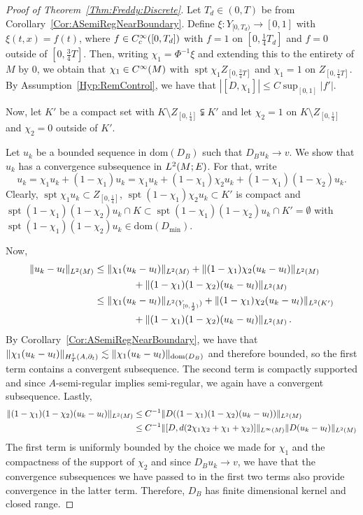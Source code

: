 \documentclass[a4paper,10pt,reqno]{amsart}
\newcommand{\modulus}[1]{|#1|}
\newcommand{\norm}[1]{\| #1 \|}%
\newcommand{\Lp}[2][{}]{{\rm L}^{#2}_{\rm #1}}%
\newcommand{\Ck}[2][{}]{{\rm C}^{#2}_{\rm #1}}%
\newcommand{\Hard}[2][{}]{{\rm H}^{#2}_{\rm #1}}%
\newcommand{\SobH}[2][{}]{\Hard[#1]{\rm #2}}
\newcommand{\dom}{\mathrm{dom}}
\DeclareMathOperator{\spt}{spt}%
\theoremstyle{definition}
\begin{document}
\begin{proof}[Proof of Theorem~\ref{Thm:Freddy:Discrete}]
Let $T_d \in  (0,T)$ be from  Corollary~\ref{Cor:ASemiRegNearBoundary}.
Define $\xi: Y_{[0,T_d)} \to [0,1]$ with $\xi(t,x) = f(t)$, where $f \in \Ck[c]{\infty}([0,T_d])$ with $f = 1$ on $[0,\tfrac 14 T_d ]$ and $f = 0$ outside of $[0,\tfrac 34 T]$.
Then, writing $\chi_1 = \Phi^{-1}\xi$ and extending this to the entirety of $M$ by $0$, we obtain that $\chi_1 \in \Ck{\infty}(M)$ with $\spt \chi_1 Z_{[0,\tfrac34 T]}$ and $\chi_1 = 1$ on $Z_{[0,\tfrac 14 T]}$. 
By Assumption~\ref{Hyp:RemControl}, we have that $\modulus{[D, \chi_1]} \leq C \sup_{[0,1]} |f'| $.

Now, let $K'$ be a compact set with $K \setminus Z_{[0,\tfrac14]} \subsetneqq K'$  and let $\chi_2 = 1$ on $K \setminus Z_{[0,\tfrac14]}$ and $\chi_2 = 0$ outside of $K'$.

Let $u_k$ be a bounded sequence in $\dom(D_B)$ such that $D_B u_k \to v$.
We show that $u_k$ has a convergence subsequence in $\Lp{2}(M;E)$.
For that, write 
$$u_k = \chi_1 u_k + (1 - \chi_1)u_k = \chi_1 u_k + (1 - \chi_1)\chi_2 u_k  + (1 - \chi_1)(1 - \chi_2) u_k.$$
Clearly, $\spt \chi_1 u_k \subset Z_{[0,\tfrac14]}$, $\spt (1 - \chi_1)\chi_2 u_k \subset K'$ is compact and $\spt (1 - \chi_1)(1 - \chi_2) u_k \cap K \subset \spt (1 - \chi_1)(1 - \chi_2) u_k \cap K' = \emptyset$ with $\spt (1 - \chi_1)(1 - \chi_2) u_k \in \dom(D_{\min})$.

Now, 
\begin{align*} 
\norm{u_k - u_l}_{\Lp{2}(M)} 
&\leq 
\norm{\chi_1 (u_k - u_l)}_{\Lp{2}(M)} +   \norm{ (1 - \chi_1)\chi_2 (u_k - u_l) }_{\Lp{2}(M)} \\ 
&\qquad\qquad + \norm{(1 - \chi_1)(1 - \chi_2) (u_k - u_l)}_{\Lp{2}(M)} \\ 
&\leq 
\norm{\chi_1 (u_k - u_l)}_{\Lp{2}(Y_{[0,\frac12)})} + \norm{ (1 - \chi_1)\chi_2 (u_k - u_l) }_{\Lp{2}(K')}   \\
&\qquad\qquad+\norm{(1 - \chi_1)(1 - \chi_2) (u_k - u_l)}_{\Lp{2}(M)} \,  .
\end{align*}
By Corollary~\ref{Cor:ASemiRegNearBoundary}, we have that $ \norm{\chi_1 (u_k - u_l)}_{\SobH[T]{1}(A,\partial_t)} \lesssim \norm{\chi_1 (u_k - u_l)}_{\dom(D_B)}$ and therefore bounded, so the first term contains a convergent subsequence.
The second term is compactly supported and since $A$-semi-regular implies semi-regular, we again have a convergent subsequence.
Lastly,
\begin{align*} 
\norm{(1 - \chi_1)(1 - \chi_2) (u_k - u_l)}_{\Lp{2}(M)} 
& \leq C^{-1} \norm{D((1 - \chi_1)(1 - \chi_2) (u_k - u_l))}_{\Lp{2}(M)} \\ 
&\leq C^{-1} \norm{[D, d(2\chi_1\chi_2 + \chi_1 + \chi_2)]}_{\Lp{\infty}(M)} \norm{D(u_k - u_l)}_{\Lp{2}(M)} 
\end{align*}
The first term is uniformly bounded by the choice we made for $\chi_1$ and the compactness of the support of $\chi_2$ and since $D_Bu_k \to v$, we have that the convergence subsequences we have passed to in the first two terms also provide convergence in the latter term. 
Therefore, $D_B$ has finite dimensional kernel and closed range.


\end{proof}
\end{document}
